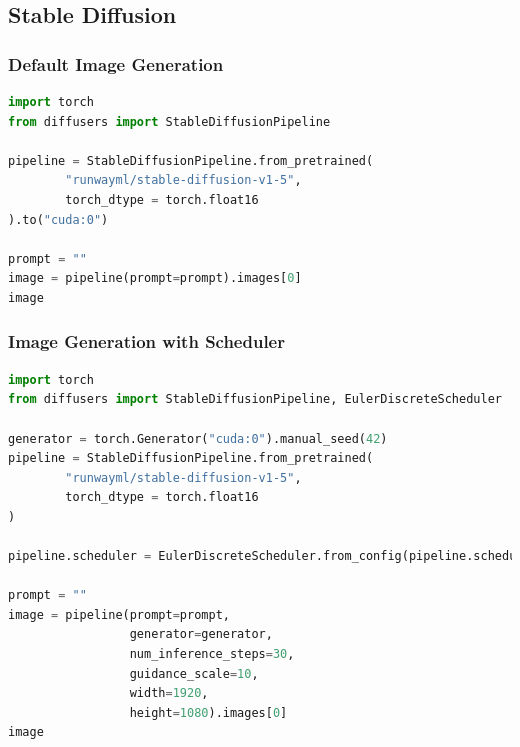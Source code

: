 \subsection{Stable Diffusion}

\subsubsection{Default Image Generation}
\begin{lstlisting}[language=Python]
import torch
from diffusers import StableDiffusionPipeline

pipeline = StableDiffusionPipeline.from_pretrained(
        "runwayml/stable-diffusion-v1-5",
        torch_dtype = torch.float16
).to("cuda:0")

prompt = ""
image = pipeline(prompt=prompt).images[0]
image
\end{lstlisting}

\subsubsection{Image Generation with Scheduler}
\begin{lstlisting}[language=Python]
import torch
from diffusers import StableDiffusionPipeline, EulerDiscreteScheduler

generator = torch.Generator("cuda:0").manual_seed(42)
pipeline = StableDiffusionPipeline.from_pretrained(
        "runwayml/stable-diffusion-v1-5",
        torch_dtype = torch.float16
)

pipeline.scheduler = EulerDiscreteScheduler.from_config(pipeline.scheduler.config)

prompt = ""
image = pipeline(prompt=prompt,
                 generator=generator,
                 num_inference_steps=30,
                 guidance_scale=10,
                 width=1920,
                 height=1080).images[0]
image
\end{lstlisting}

